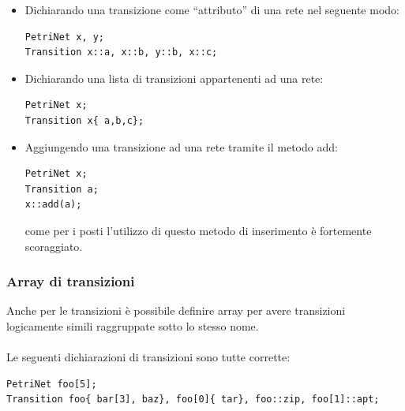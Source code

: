 \documentclass[italian,12pt]{book}
\begin{document}
\begin{itemize}

\item Dichiarando una transizione come ``attributo'' di una rete nel seguente modo:
\begin{verbatim}PetriNet x, y;
Transition x::a, x::b, y::b, x::c;
\end{verbatim}

\item Dichiarando una lista di transizioni appartenenti ad una rete:
\begin{verbatim}PetriNet x;
Transition x{ a,b,c};
\end{verbatim}

\item Aggiungendo una transizione ad una rete tramite il metodo add:
\begin{verbatim}PetriNet x;
Transition a;
x::add(a);
\end{verbatim}
come per i posti l'utilizzo di questo metodo di inserimento è fortemente scoraggiato.

\end{itemize}

\subsubsection{Array di transizioni}
Anche per le transizioni è possibile definire array per avere transizioni logicamente simili raggruppate
sotto lo stesso nome.\\
\\
Le seguenti dichiarazioni di transizioni sono tutte corrette:
\begin{verbatim}PetriNet foo[5];
Transition foo{ bar[3], baz}, foo[0]{ tar}, foo::zip, foo[1]::apt;
\end{verbatim}
\end{document}
